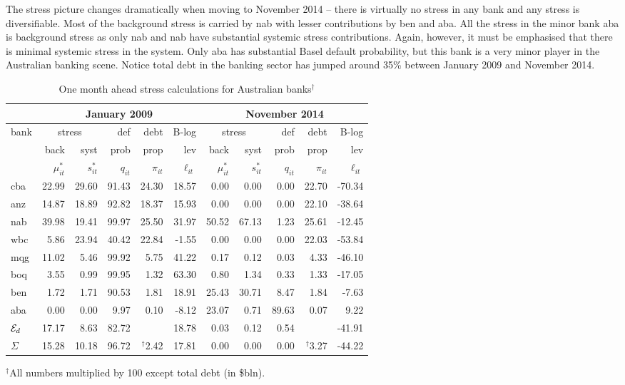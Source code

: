 \documentclass[authoryear]{elsarticle}
\newcommand{\Ex}{{\cal E}}
\begin{document}
 The stress picture  changes dramatically when moving to November 2014 -- there is virtually no stress in any bank and any stress is diversifiable.    Most of the  background stress is carried by nab with lesser contributions by ben and aba.    All the stress in the minor bank aba is background stress as only nab and nab have substantial systemic stress contributions.   Again, however, it must be emphasised that there is minimal systemic stress in the system.    Only aba has substantial Basel default probability, but this bank is a very minor player in the Australian banking scene.   Notice total debt in the banking sector has jumped around 35\% between January 2009 and November 2014.

\begin{table}[ht]
\caption{One month ahead stress calculations for Australian banks$^\dag$}\label{twodates}
\centering
\vspace{4mm}
\begin{tabular}{l|rrrrr|rrrrr}
\hline
&\multicolumn{5}{c|}{January 2009}&\multicolumn{5}{c}{November 2014}\\
  \hline
bank & \multicolumn{2}{c}{stress} & def & debt & B-log& \multicolumn{2}{c}{stress} & def & debt & B-log \\
  \cline{2-3}\cline{7-8}
           & back & syst & prob & prop & lev& back & syst & prob & prop & lev \\
  \cline{2-11} 
            & $\mu^*_{it}$  & $s^*_{it}$ & $q_{it}$ & $\pi_{it}$ & $\ell_{it}$
        & $\mu^*_{it}$  & $s^*_{it}$ & $q_{it}$ & $\pi_{it}$ & $\ell_{it}$ 
        \\
  \hline
cba & 22.99 & 29.60 & 91.43 & 24.30 & 18.57 & 0.00 & 0.00 & 0.00 & 22.70 & -70.34 \\ 
anz & 14.87 & 18.89 & 92.82 & 18.37 & 15.93 & 0.00 & 0.00 & 0.00 & 22.10 & -38.64 \\ 
nab & 39.98 & 19.41 & 99.97 & 25.50 & 31.97 & 50.52 & 67.13 & 1.23 & 25.61 & -12.45 \\ 
wbc & 5.86 & 23.94 & 40.42 & 22.84 & -1.55 & 0.00 & 0.00 & 0.00 & 22.03 & -53.84 \\ 
mqg & 11.02 & 5.46 & 99.92 & 5.75 & 41.22 & 0.17 & 0.12 & 0.03 & 4.33 & -46.10 \\ 
boq & 3.55 & 0.99 & 99.95 & 1.32 & 63.30 & 0.80 & 1.34 & 0.33 & 1.33 & -17.05 \\ 
ben & 1.72 & 1.71 & 90.53 & 1.81 & 18.91 & 25.43 & 30.71 & 8.47 & 1.84 & -7.63 \\ 
aba & 0.00 & 0.00 & 9.97 & 0.10 & -8.12 & 23.07 & 0.71 & 89.63 & 0.07 & 9.22 \\ 
  \hline
$\Ex_d$ & 17.17 & 8.63 & 82.72 &  & 18.78 & 0.03 & 0.12 & 0.54 &  & -41.91 \\ 
$\Sigma$ & 15.28 & 10.18 & 96.72 & $^\dag$2.42 & 17.81 & 0.00 & 0.00 & 0.00 & $^\dag$3.27 & -44.22 \\ 
\hline
\end{tabular}
\end{table}
\small{$^\dag$All numbers multiplied by 100 except total debt (in \$bln).}
\end{document}
